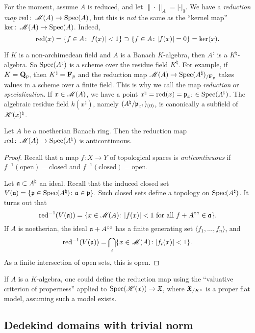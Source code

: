For the moment, assume $A$ is reduced, and let $\|\cdot\|_A=|\cdot|_0$. We have 
a \emph{reduction map} $\operatorname{red}\colon \operatorname{\mathscr{M}}(A)\to \operatorname{Spec}(A)$, but this is 
\emph{not} the same as the ``kernel map'' 
$\ker\colon \operatorname{\mathscr{M}}(A)\to \operatorname{Spec}(A)$. Indeed, 
\[
	\operatorname{red}(x) = \{f\in A\colon |f(x)|<1\} \supset \{f\in A\colon |f(x)|=0\} = \ker(x) .
\]

If $K$ is a non-archimedean field and $A$ is a Banach $K$-algebra, then 
$A^\natural$ is a $K^\natural$-algebra. So $\operatorname{Spec}(A^\natural)$ is a scheme over 
the residue field $K^\natural$. For example, if $K=\mathbf{Q}_p$, then 
$K^\natural=\mathbf{F}_p$ and the reduction map 
$\operatorname{\mathscr{M}}(A)\to \operatorname{Spec}(A^\natural)_{/\mathbf{F}_p}$ takes values in a scheme over a 
finite field. This is why we call the map \emph{reduction} or 
\emph{specialization}. If $x\in \operatorname{\mathscr{M}}(A)$, we have a point 
$x^\natural=\operatorname{red}(x)=\mathfrak{p}_{x^\natural}\in \operatorname{Spec}(A^\natural)$. The algebraic 
residue field $k(x^\natural)$, namely $(A^\natural/\mathfrak{p}_{x^\natural})_{(0)}$, is 
canonically a subfield of $\mathscr{H}(x)^\natural$. 

\begin{theorem}
Let $A$ be a noetherian Banach ring. Then the reduction map 
$\operatorname{red}\colon \operatorname{\mathscr{M}}(A)\to \operatorname{Spec}(A^\natural)$ is anticontinuous.
\end{theorem}
\begin{proof}
Recall that a map $f\colon X\to Y$ of topological spaces is 
\emph{anticontinuous} if $f^{-1}(\text{open})=\text{closed}$ and 
$f^{-1}(\text{closed})=\text{open}$. 

Let $\mathfrak{a}\subset A^\natural$ an ideal. Recall that the 
induced closed set $V(\mathfrak{a})=\{\mathfrak{p}\in \operatorname{Spec}(A^\natural)\colon \mathfrak{a}\in \mathfrak{p}\}$. Such 
closed sets define a topology on $\operatorname{Spec}(A^\natural)$. It turns out that 
\[
	\operatorname{red}^{-1}(V(\mathfrak{a})) = \{x\in \operatorname{\mathscr{M}}(A)\colon |f(x)|<1\text{ for all }f+A^{\circ\circ}\in \mathfrak{a}\} .
\]
If $A$ is noetherian, the ideal $\mathfrak{a}+A^{\circ\circ}$ has a finite generating 
set $\langle f_1,\dots,f_n\rangle$, and 
\[
	\operatorname{red}^{-1}(V(\mathfrak{a})) = \bigcap_i \{x\in \operatorname{\mathscr{M}}(A)\colon |f_i(x)|<1\} .
\]
As a finite intersection of open sets, this is open. 
\end{proof}

If $A$ is a $K$-algebra, one could define the reduction map using the 
``valuative criterion of properness'' applied to $\operatorname{Spec}(\mathscr{H}(x))\to \mathfrak{X}$, 
where $\mathfrak{X}_{/K^\circ}$ is a proper flat model, assuming such a model exists. 





\subsection{Dedekind domains with trivial norm}

